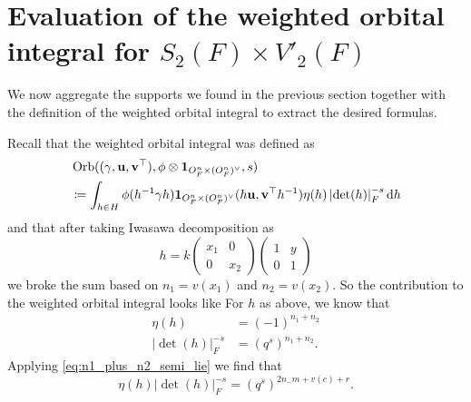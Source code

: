 \chapter{Evaluation of the weighted orbital integral for $S_2(F) \times V'_2(F)$}
\label{ch:orbitalFJ2}

We now aggregate the supports we found in the previous section together with the
definition of the weighted orbital integral to extract the desired formulas.

Recall that the weighted orbital integral was defined as
\begin{align*}
  & \Orb(\guv, \phi \otimes \oneV, s) \\
  &\coloneqq
  \int_{h \in H} \phi(h\inv \gamma h)
  \oneV(h \uu, \vv^\top h^{-1})
  \eta(h) \left\lvert \det(h) \right\rvert_F^{-s} \odif h
\end{align*}
and that after taking Iwasawa decomposition as
\[ h = k \begin{pmatrix} x_1 & 0 \\ 0 & x_2 \end{pmatrix}
  \begin{pmatrix} 1 & y \\ 0 & 1 \end{pmatrix} \]
we broke the sum based on $n_1 = v(x_1)$ and $n_2 = v(x_2)$.
So the contribution to the weighted orbital integral looks like
For $h$ as above, we know that
\begin{align*}
  \eta(h) &= (-1)^{n_1 + n_2} \\
  \left\lvert \det(h) \right\rvert^{-s}_F &= (q^s)^{n_1 + n_2}.
\end{align*}
Applying \eqref{eq:n1_plus_n2_semi_lie} we find that
\[
  \eta(h)
  \left\lvert \det(h) \right\rvert^{-s}_F
  = (q^s)^{2n_ - m + v(c) + r}.
\]


